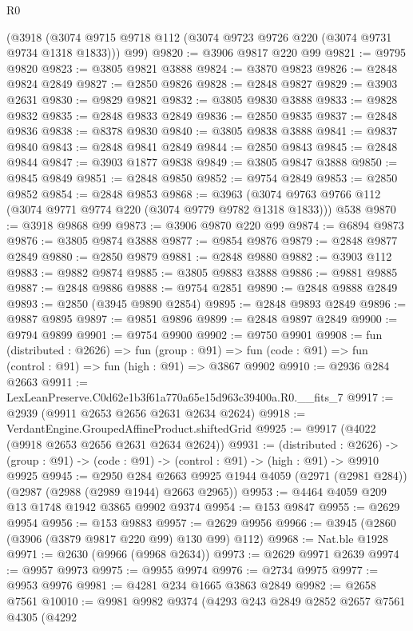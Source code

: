 \begin{lexlean}{R0}
\begin{coremodule}
    (@3918 (@3074 @9715 @9718 @112 (@3074 @9723 @9726 @220 (@3074 @9731 @9734 @1318 @1833))) @99)
@9820 := @3906 @9817 @220 @99
@9821 := @9795 @9820
@9823 := @3805 @9821 @3888
@9824 := @3870 @9823
@9826 := @2848 @9824 @2849
@9827 := @2850 @9826
@9828 := @2848 @9827
@9829 := @3903 @2631
@9830 := @9829 @9821
@9832 := @3805 @9830 @3888
@9833 := @9828 @9832
@9835 := @2848 @9833 @2849
@9836 := @2850 @9835
@9837 := @2848 @9836
@9838 := @8378 @9830
@9840 := @3805 @9838 @3888
@9841 := @9837 @9840
@9843 := @2848 @9841 @2849
@9844 := @2850 @9843
@9845 := @2848 @9844
@9847 := @3903 @1877 @9838
@9849 := @3805 @9847 @3888
@9850 := @9845 @9849
@9851 := @2848 @9850
@9852 := @9754 @2849
@9853 := @2850 @9852
@9854 := @2848 @9853
@9868 := @3963
    (@3074 @9763 @9766 @112 (@3074 @9771 @9774 @220 (@3074 @9779 @9782 @1318 @1833)))
    @538
@9870 := @3918 @9868 @99
@9873 := @3906 @9870 @220 @99
@9874 := @6894 @9873
@9876 := @3805 @9874 @3888
@9877 := @9854 @9876
@9879 := @2848 @9877 @2849
@9880 := @2850 @9879
@9881 := @2848 @9880
@9882 := @3903 @112
@9883 := @9882 @9874
@9885 := @3805 @9883 @3888
@9886 := @9881 @9885
@9887 := @2848 @9886
@9888 := @9754 @2851
@9890 := @2848 @9888 @2849
@9893 := @2850 (@3945 @9890 @2854)
@9895 := @2848 @9893 @2849
@9896 := @9887 @9895
@9897 := @9851 @9896
@9899 := @2848 @9897 @2849
@9900 := @9794 @9899
@9901 := @9754 @9900
@9902 := @9750 @9901
@9908 := fun (distributed : @2626) =>
  fun (group : @91) => fun (code : @91) => fun (control : @91) => fun (high : @91) => @3867 @9902
@9910 := @2936 @284 @2663
@9911 := LexLeanPreserve.C0d62e1b3f61a770a65e15d963c39400a.R0.__fits_7
@9917 := @2939 (@9911 @2653 @2656 @2631 @2634 @2624)
@9918 := VerdantEngine.GroupedAffineProduct.shiftedGrid
@9925 := @9917 (@4022 (@9918 @2653 @2656 @2631 @2634 @2624))
@9931 := (distributed : @2626) ->
  (group : @91) -> (code : @91) -> (control : @91) -> (high : @91) -> @9910 @9925
@9945 := @2950
    @284
    @2663
    @9925
    @1944
    @4059
    (@2971 (@2981 @284))
    (@2987 (@2988 (@2989 @1944) @2663 @2965))
@9953 := @4464 @4059 @209 @13 @1748 @1942 @3865 @9902 @9374
@9954 := @153 @9847
@9955 := @2629 @9954
@9956 := @153 @9883
@9957 := @2629 @9956
@9966 := @3945 (@2860 (@3906 (@3879 @9817 @220 @99) @130 @99) @112)
@9968 := Nat.ble @1928
@9971 := @2630 (@9966 (@9968 @2634))
@9973 := @2629 @9971 @2639
@9974 := @9957 @9973
@9975 := @9955 @9974
@9976 := @2734 @9975
@9977 := @9953 @9976
@9981 := @4281 @234 @1665 @3863 @2849
@9982 := @2658 @7561
@10010 := @9981
    @9982
    @9374
    (@4293
      @243
      @2849
      @2852
      @2657
      @7561
      @4305
      (@4292

\end{coremodule}
\end{lexlean}
